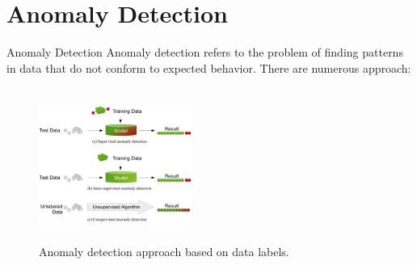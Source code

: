 \documentclass{beamer}
\theoremstyle{plain}
\theoremstyle{definition}
\theoremstyle{plain}
\theoremstyle{plain}
\begin{document}
\section{Anomaly Detection}
\begin{frame}{Anomaly Detection}
Anomaly detection refers to the problem of finding patterns in data that do not conform to expected behavior. There are numerous approach:

\begin{figure}[ht]
\begin{center}
\includegraphics[width=5cm, height =5cm]{./Figures/anomaly.png}
\caption {Anomaly detection approach based on data labels.}
\label{anomaly}
\end{center}
\end{figure}

\end{frame}
\end{document}
